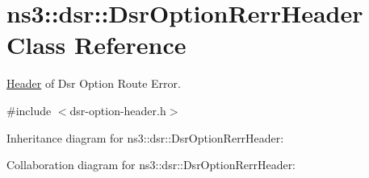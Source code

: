 \hypertarget{classns3_1_1dsr_1_1DsrOptionRerrHeader}{}\section{ns3\+:\+:dsr\+:\+:Dsr\+Option\+Rerr\+Header Class Reference}
\label{classns3_1_1dsr_1_1DsrOptionRerrHeader}


\hyperlink{classns3_1_1Header}{Header} of Dsr Option Route Error.  




{\ttfamily \#include $<$dsr-\/option-\/header.\+h$>$}



Inheritance diagram for ns3\+:\+:dsr\+:\+:Dsr\+Option\+Rerr\+Header\+:


Collaboration diagram for ns3\+:\+:dsr\+:\+:Dsr\+Option\+Rerr\+Header\+:
